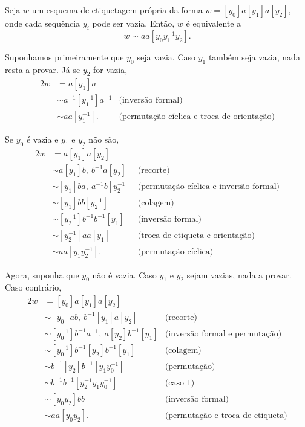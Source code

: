\begin{lemma}\label{etiquetagem-lemma} %
    Seja $w$ um esquema de etiquetagem própria da forma $w = [y_0]a[y_1]a[y_2]$, onde cada sequência $y_i$ pode ser vazia. Então, $w$ é equivalente a
    \[w\sim aa[y_0 y_1^{-1} y_2].\]

    \begin{dem}
        Suponhamos primeiramente que $y_0$ seja vazia. Caso $y_1$ também seja vazia, nada resta a provar. Já se $y_2$ for vazia,
        \begin{alignat*}{2}
            w &= a[y_1]a&~\\
            &\sim a^{-1}[y_1^{-1}]a^{-1} &\text{(inversão formal)}\\
            &\sim aa[y_1^{-1}]. &\text{(permutação cíclica e troca de orientação)}
        \end{alignat*}

        Se $y_0$ é vazia e $y_1$ e $y_2$ não são,
        \begin{alignat*}{2}
            w &= a[y_1]a[y_2]&~\\
            &\sim a[y_1]b,\ b^{-1}a[y_2] &\text{(recorte)}\\
            &\sim [y_1]ba,\ a^{-1} b[y_2^{-1}] &\text{(permutação cíclica e inversão formal)}\\
            &\sim [y_1]bb[y_2^{-1}] &\text{(colagem)}\\
            &\sim [y_2^{-1}]b^{-1}b^{-1}[y_1] &\text{(inversão formal)}\\
            &\sim [y_2^{-1}]aa[y_1] &\text{(troca de etiqueta e orientação)}\\
            &\sim aa[y_1 y_2^{-1}]. &\text{(permutação cíclica)}
        \end{alignat*}

        Agora, suponha que $y_0$ não é vazia. Caso $y_1$ e $y_2$ sejam vazias, nada a provar. Caso contrário,
        \begin{alignat*}{2}
            w &= [y_0]a[y_1]a[y_2]&~\\
            &\sim [y_0]ab,\ b^{-1}[y_1]a[y_2] &\text{(recorte)}\\
            &\sim [y_0^{-1}]b^{-1}a^{-1},\ a[y_2]b^{-1}[y_1] &\text{(inversão formal e permutação)}\\
            &\sim [y_0^{-1}]b^{-1}[y_2]b^{-1}[y_1] &\text{(colagem)}\\
            &\sim b^{-1}[y_2]b^{-1}[y_1 y_0^{-1}] &\text{(permutação)}\\
            &\sim b^{-1}b^{-1}[y_2^{-1} y_1 y_0^{-1}] &\text{(caso 1)}\\
            &\sim [y_0 y_2]bb &\text{(inversão formal)}\\
            &\sim aa[y_0 y_2]. &\text{(permutação e troca de etiqueta)}\tag*{\qedhere}
        \end{alignat*}
    \end{dem}
\end{lemma}

